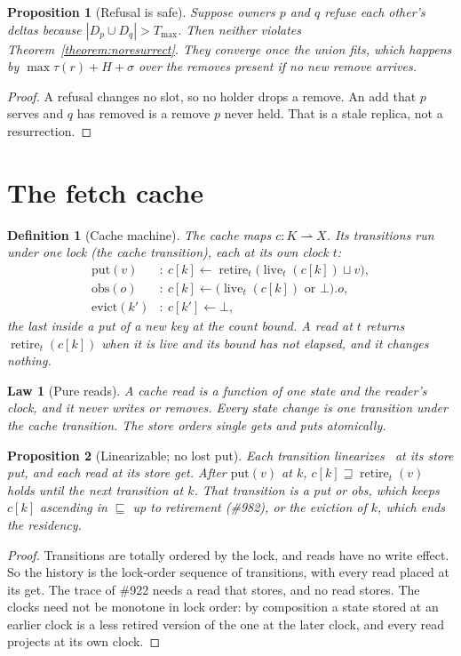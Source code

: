 \documentclass[journal]{IEEEtran}
\newtheorem{definition}{Definition}
\newtheorem{law}{Law}
\newtheorem{proposition}{Proposition}
\newcommand{\ret}{\operatorname{retire}}
\newcommand{\live}{\operatorname{live}}
\newcommand{\Tmax}{T_{\max}}
\newcommand{\issue}[1]{\#{#1}}
\begin{document}
\begin{proposition}[Refusal is safe]\label{prop:diverge}
Suppose owners $p$ and $q$ refuse each other's deltas because $|D_p\cup D_q|>\Tmax$.  Then
neither violates Theorem~\ref{theorem:noresurrect}.  They converge once the union fits, which
happens by $\max\tau(r)+H+\sigma$ over the removes present if no new remove arrives.
\end{proposition}
\begin{proof}
A refusal changes no slot, so no holder drops a remove.  An add that $p$ serves and $q$ has
removed is a remove $p$ never held.  That is a stale replica, not a resurrection.
\end{proof}

\section{The fetch cache}\label{sec:cache}

\begin{definition}[Cache machine]\label{def:cache}
The cache maps $c:K\rightharpoonup X$.  Its transitions run under one lock (the cache
transition), each at its own clock $t$:
\begin{align*}
\mathrm{put}(v)&:\ c[k]\leftarrow\ret_t\big(\live_t(c[k])\sqcup v\big),\\
\mathrm{obs}(o)&:\ c[k]\leftarrow\big(\live_t(c[k])\text{ or }\bot\big).o,\\
\mathrm{evict}(k')&:\ c[k']\leftarrow\bot,
\end{align*}
the last inside a put of a new key at the count bound.
A read at $t$ returns $\ret_t(c[k])$ when it is live and its bound has not elapsed, and it
changes nothing.
\end{definition}

\begin{law}[Pure reads]\label{law:pure}
A cache read is a function of one state and the reader's clock, and it never writes or
removes.  Every state change is one transition under the cache transition.  The store
orders single gets and puts atomically.
\end{law}

\begin{proposition}[Linearizable; no lost put]\label{prop:linear}
Each transition linearizes~\cite{HerlihyWing1990} at its store put, and each read at its store get.  After
$\mathrm{put}(v)$ at $k$, $c[k]\sqsupseteq\ret_t(v)$ holds until the next transition at $k$.
That transition is a put or obs, which keeps $c[k]$ ascending in $\sqsubseteq$ up to
retirement (\issue{982}), or the eviction of $k$, which ends the residency.
\end{proposition}
\begin{proof}
Transitions are totally ordered by the lock, and reads have no write effect.  So the history
is the lock-order sequence of transitions, with every read placed at its get.  The trace of
\issue{922} needs a read that stores, and no read stores.  The clocks need not be monotone in
lock order: by composition a state stored at an earlier clock is a less retired version of
the one at the later clock, and every read projects at its own clock.
\end{proof}
\end{document}
